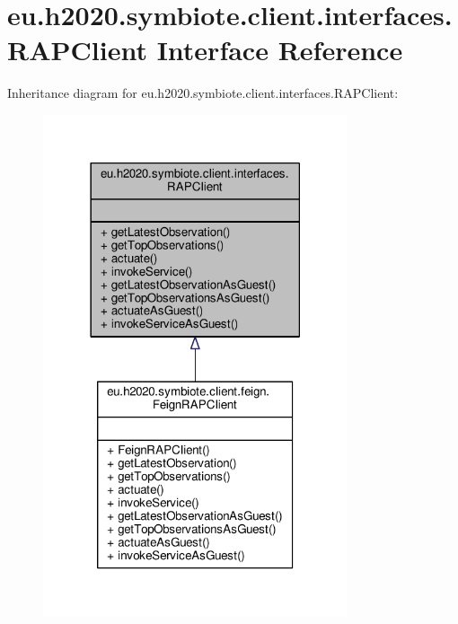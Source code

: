 \hypertarget{interfaceeu_1_1h2020_1_1symbiote_1_1client_1_1interfaces_1_1RAPClient}{}\section{eu.\+h2020.\+symbiote.\+client.\+interfaces.\+R\+A\+P\+Client Interface Reference}
\label{interfaceeu_1_1h2020_1_1symbiote_1_1client_1_1interfaces_1_1RAPClient}


Inheritance diagram for eu.\+h2020.\+symbiote.\+client.\+interfaces.\+R\+A\+P\+Client\+:\nopagebreak
\begin{figure}[H]
\begin{center}
\leavevmode
\includegraphics[width=254pt]{interfaceeu_1_1h2020_1_1symbiote_1_1client_1_1interfaces_1_1RAPClient__inherit__graph}
\end{center}
\end{figure}


